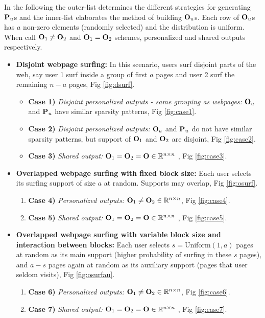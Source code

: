 \documentclass[conference]{IEEEtran}
\begin{document}
	In the following the outer-list determines the different strategies for generating $\P_u$s and the inner-list elaborates the method of building $\O_u$s. 
	Each row of $\O_u$s has $a$ non-zero elements (randomly selected) and the distribution is uniform.
	When call $\O_1 \neq \O_2$ and $\O_1 = \O_2$ schemes, personalized and shared outputs respectively.
	
	\begin{itemize}
		\item {\bf Disjoint webpage surfing:}  In this scenario, users surf disjoint parts of the web, say user 1 surf inside a group of first $a$ pages and user 2 surf the remaining $n - a$ pages, Fig \ref{fig:dsurf}.
		\begin{itemize}
			\item[] {\bf Case 1)} \emph{Disjoint personalized outputs - same grouping as webpages:} $\O_u$ and $\P_u$ have similar sparsity patterns, Fig \ref{fig:case1}. 
			\item[] {\bf Case 2)} \emph{Disjoint personalized outputs:} $\O_u$ and $\P_u$ do not have similar sparsity patterns, but support of $\O_1$ and $\O_2$ are disjoint, Fig \ref{fig:case2}. 
			\item[] {\bf Case 3)} \emph{Shared output:} $\O_1 = \O_2 = \O \in \reals^{n \times n}$ , Fig \ref{fig:case3}.
		\end{itemize}
		\item {\bf Overlapped webpage surfing with fixed block size: }
		Each user selects its surfing support of size $a$ at random. 
		Supports may overlap, Fig \ref{fig:osurf}. 
		\begin{enumerate}
			\item[] {\bf Case 4)} \emph{Personalized outputs:} $\O_1 \neq \O_2 \in \reals^{n \times n}$, Fig \ref{fig:case4}. 
			\item[] {\bf Case 5)} \emph{Shared output:} $\O_1 = \O_2 = \O \in \reals^{n \times n}$ , Fig \ref{fig:case5}.
		\end{enumerate}
		\item {\bf Overlapped webpage surfing with variable block size and interaction between blocks: }
		Each user selects $s = \text{Uniform}(1, a)$ pages at random as its main support (higher probability of surfing in these $s$ pages), and $a-s$ pages again at random as its auxiliary support (pages that user seldom visits), Fig \ref{fig:osurfau}.
		\begin{enumerate}
			\item[] {\bf Case 6)} \emph{Personalized outputs:} $\O_1 \neq \O_2 \in \reals^{n \times n}$, Fig \ref{fig:case6}. 
			\item[] {\bf Case 7)} \emph{Shared output:} $\O_1 = \O_2 = \O \in \reals^{n \times n}$ , Fig \ref{fig:case7}.
		\end{enumerate}
	\end{itemize}
	
\end{document}
